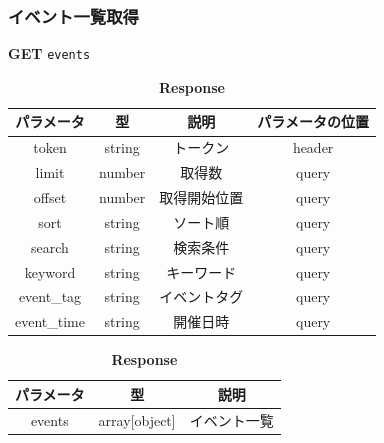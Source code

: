 \subsubsection*{イベント一覧取得}
\textbf{GET} \texttt{events}
\begin{table}[H]
  \begin{minipage}
    {0.5\hsize} \centering
    \captionsetup{labelformat=empty,labelsep=none}
    \caption{\textbf{Request}}
    \small
    \begin{tabular}{|c|c|c|c|} \hline
      パラメータ       & 型      & 説明     & パラメータの位置 \\ \hline \hline
      token       & string & トークン   & header   \\ \hline
      limit       & number & 取得数    & query    \\ \hline
      offset      & number & 取得開始位置 & query    \\ \hline
      sort        & string & ソート順   & query    \\ \hline
      search      & string & 検索条件   & query    \\ \hline
      keyword     & string & キーワード  & query    \\ \hline
      event\_tag  & string & イベントタグ & query    \\ \hline
      event\_time & string & 開催日時   & query    \\ \hline
    \end{tabular}
  \end{minipage}
  \begin{minipage}
    {0.5\hsize} \centering
    \captionsetup{labelformat=empty,labelsep=none}
    \caption{\textbf{Response}}
    \begin{tabular}{|c|c|c|} \hline
      パラメータ  & 型             & 説明     \\ \hline \hline
      events & array[object] & イベント一覧 \\ \hline
    \end{tabular}
  \end{minipage}
\end{table}

